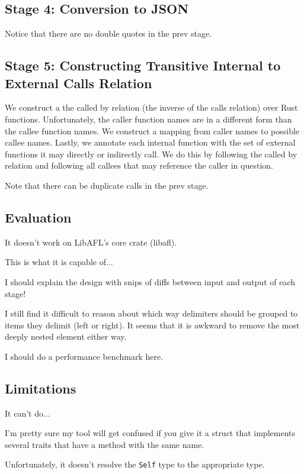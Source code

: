 \documentclass[11pt]{article}
\begin{document}
\subsection{Stage 4: Conversion to JSON}

Notice that there are no double quotes in the prev stage.

\subsection{Stage 5: Constructing Transitive Internal to External Calls Relation}

We construct a the called by relation (the inverse of the calls relation) over Rust functions.
Unfortunately, the caller function names are in a different form than the callee function names.
We construct a mapping from caller names to possible callee names.
Lastly, we annotate each internal function with the set of external functions it may directly or indirectly call.
We do this by following the called by relation and following all callees that may reference the caller in question.

Note that there can be duplicate calls in the prev stage.

\subsection{Evaluation}

It doesn't work on LibAFL's core crate (libafl).

This is what it is capable of...

I should explain the design with snips of diffs between input and output of each stage!

I still find it difficult to reason about which way delimiters should be grouped to items they delimit (left or right).
It seems that it is awkward to remove the most deeply nested element either way.

I should do a performance benchmark here.

\subsection{Limitations}
It can't do...

I'm pretty sure my tool will get confused if you give it a struct that implements several traits that have a method with the same name.

Unfortunately, it doesn't resolve the \lstinline{Self} type to the appropriate type.
\end{document}
